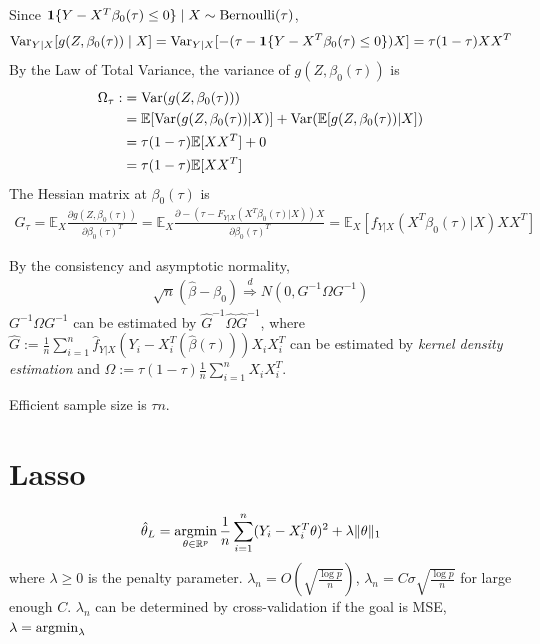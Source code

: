 \documentclass[11pt]{elegantbook}
\newcommand{\argmin}{\operatornamewithlimits{argmin}}
\begin{document}
Since $\mathbf{1}\{Y-X^T\beta_0(\tau)\leq 0\}\mid X\sim \textnormal{Bernoulli}(\tau)$,
\begin{equation}
    \begin{aligned}
        \textnormal{Var}_{Y|X}[g(Z,\beta_0(\tau))\mid X]=\textnormal{Var}_{Y|X}[-(\tau-\mathbf{1}\{Y-X^T\beta_0(\tau)\leq 0\})X]=\tau(1-\tau)XX^T
    \end{aligned}
    \nonumber
\end{equation}
By the Law of Total Variance, the variance of $g(Z,\beta_0(\tau))$ is
\begin{equation}
    \begin{aligned}
        \Omega_\tau:&=\textnormal{Var}(g(Z,\beta_0(\tau)))\\
        &=\mathbb{E}[\textnormal{Var}(g(Z,\beta_0(\tau))|X)]+\textnormal{Var}(\mathbb{E}[g(Z,\beta_0(\tau))|X])\\
        &=\tau(1-\tau) \mathbb{E}[XX^T]+0\\
        &=\tau(1-\tau) \mathbb{E}[XX^T]
    \end{aligned}
    \nonumber
\end{equation}
The Hessian matrix at $\beta_0(\tau)$ is
\begin{equation}
    \begin{aligned}
        G_\tau=\mathbb{E}_X\frac{\partial g(Z,\beta_0(\tau))}{\partial \beta_0(\tau)^T}=\mathbb{E}_X\frac{\partial -(\tau-F_{Y|X}(X^T\beta_0(\tau)|X))X}{\partial \beta_0(\tau)^T}=\mathbb{E}_X\left[f_{Y|X}(X^T\beta_0(\tau)|X)XX^T\right]
    \end{aligned}
    \nonumber
\end{equation}

By the consistency and asymptotic normality,
\begin{equation}
    \begin{aligned}
        \sqrt{n}\left(\hat{\beta}-\beta_0\right) \stackrel{d}{\Rightarrow} N\left(0,G^{-1}\Omega G^{-1}\right)
    \end{aligned}
    \nonumber
\end{equation}
$G^{-1}\Omega G^{-1}$ can be estimated by $\hat{G}^{-1}\hat{\Omega}\hat{G}^{-1}$, where $\hat{G}:=\frac{1}{n}\sum_{i=1}^n\hat{f}_{Y|X}\left(Y_i-X_i^T(\hat{\beta}(\tau))\right)X_iX_i^T$ can be estimated by \textit{kernel density estimation} and $\hat{\Omega}:=\tau(1-\tau)\frac{1}{n}\sum_{i=1}^nX_iX_i^T$.


Efficient sample size is $\tau n$.

\section{Lasso}
$$\hat{\theta}_L=\argmin_{\theta\in \mathbb{R}^p}\frac{1}{n}\sum_{i=1}^n(Y_i-X_i^T\theta)^2+\lambda\|\theta\|_1$$
where $\lambda\geq 0$ is the penalty parameter. $\lambda_n=O\left(\sqrt{\frac{\log p}{n}}\right)$, $\lambda_n=C\sigma\sqrt{\frac{\log p}{n}}$ for large enough $C$. $\lambda_n$ can be determined by cross-validation if the goal is MSE, $\lambda=\argmin_{\lambda}$
\end{document}
